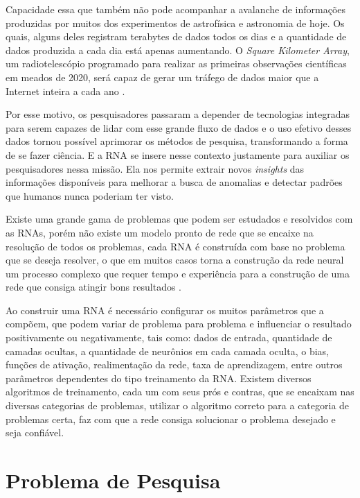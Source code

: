 Capacidade essa que também não pode acompanhar a avalanche de informações produzidas por muitos dos experimentos de astrofísica e astronomia de hoje. Os quais, alguns deles registram terabytes de dados todos os dias e a quantidade de dados produzida a cada dia está apenas aumentando. O \textit{Square Kilometer Array}, um radiotelescópio programado para realizar as primeiras observações científicas em meados de 2020, será capaz de gerar um tráfego de dados maior que a Internet inteira a cada ano \cite{ska-dewdney2009square, scaife2020big, greig2020reionization}.

Por esse motivo, os pesquisadores passaram a depender de tecnologias integradas para serem capazes de lidar com esse grande fluxo de dados e o uso efetivo desses dados tornou possível aprimorar os métodos de pesquisa, transformando a forma de se fazer ciência. E a RNA se insere nesse contexto justamente para auxiliar os pesquisadores nessa missão. Ela nos permite extrair novos \textit{insights} das informações disponíveis para melhorar a busca de anomalias e detectar padrões que humanos nunca poderiam ter visto.

Existe uma grande gama de problemas que podem ser estudados e resolvidos com as RNAs, porém não existe um modelo pronto de rede que se encaixe na resolução de todos os problemas, cada RNA é construída com base no problema que se deseja resolver, o que em muitos casos torna a construção da rede neural um processo complexo que requer tempo e experiência para a construção de uma rede que consiga atingir bons resultados \cite{barros2018avaliaccao}. 

Ao construir uma RNA é necessário configurar os muitos parâmetros que a compõem, que podem variar de problema para problema e influenciar o resultado positivamente ou negativamente, tais como: dados de entrada, quantidade de camadas ocultas, a quantidade de neurônios em cada camada oculta, o bias, funções de ativação, realimentação da rede, taxa de aprendizagem, entre outros parâmetros dependentes do tipo treinamento da RNA. Existem diversos algoritmos de treinamento, cada um com seus prós e contras, que se encaixam nas diversas categorias de problemas, utilizar o algoritmo correto para a categoria de problemas certa, faz com que a rede consiga solucionar o problema desejado e seja confiável.

\section{Problema de Pesquisa}
\label{sec:problema-de-pesquisa}

